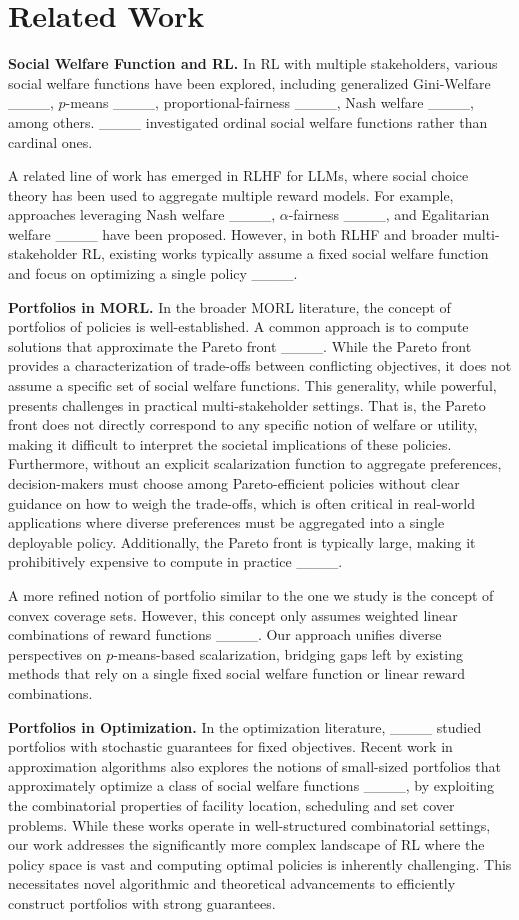 \section{Related Work}
\label{sec:related}

\textbf{Social Welfare Function and RL.}
In RL with multiple stakeholders, various social welfare functions have been explored, including generalized Gini-Welfare ____, $p$-means ____, proportional-fairness ____, Nash welfare ____, among others. ____ investigated ordinal social welfare functions rather than cardinal ones. 

A related line of work has emerged in RLHF for LLMs, where social choice theory has been used to aggregate multiple reward models. For example, approaches leveraging Nash welfare ____, $\alpha$-fairness ____, and Egalitarian welfare ____ have been proposed. However, in both RLHF and broader multi-stakeholder RL, existing works typically assume a fixed social welfare function and focus on optimizing a single policy ____.

\textbf{Portfolios in MORL.}
In the broader MORL literature, the concept of portfolios of policies is well-established. A common approach is to compute solutions that approximate the Pareto front ____. While the Pareto front provides a characterization of trade-offs between conflicting objectives, it does not assume a specific set of social welfare functions. This generality, while powerful, presents challenges in practical multi-stakeholder settings. That is, the Pareto front does not directly correspond to any specific notion of welfare or utility, making it difficult to interpret the societal implications of these policies. Furthermore, without an explicit scalarization function to aggregate preferences, decision-makers must choose among Pareto-efficient policies without clear guidance on how to weigh the trade-offs, which is often critical in real-world applications where diverse preferences must be aggregated into a single deployable policy. Additionally, the Pareto front is typically large, making it prohibitively expensive to compute in practice ____. 

A more refined notion of portfolio similar to the one we study is the concept of convex coverage sets. However, this concept only assumes weighted linear combinations of reward functions ____. Our approach unifies diverse perspectives on $p$-means-based scalarization, bridging gaps left by existing methods that rely on a single fixed social welfare function or linear reward combinations. 

\textbf{Portfolios in Optimization.}
In the optimization literature, ____ studied portfolios with stochastic guarantees for fixed objectives. Recent work in approximation algorithms also explores the notions of small-sized portfolios that approximately optimize a class of social welfare functions ____, by exploiting the combinatorial properties of facility location, scheduling and set cover problems. While these works operate in well-structured combinatorial settings, our work addresses the significantly more complex landscape of RL where the policy space is vast and computing optimal policies is inherently challenging. This necessitates novel algorithmic and theoretical advancements to efficiently construct portfolios with strong guarantees.